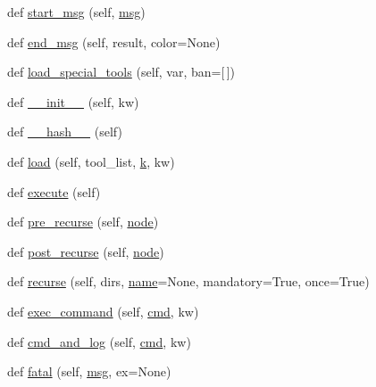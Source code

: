\begin{DoxyCompactItemize}
\item 
def \hyperlink{classwaflib_1_1_context_1_1_context_a344a0dff2c7b0d2d76057d55b83c3f16}{start\+\_\+msg} (self, \hyperlink{classwaflib_1_1_context_1_1_context_a7495a2e04e528aa54bda3cadf08240cb}{msg})
\item 
def \hyperlink{classwaflib_1_1_context_1_1_context_a6340799a7fa4dc1230d13b7c08eec789}{end\+\_\+msg} (self, result, color=None)
\item 
def \hyperlink{classwaflib_1_1_context_1_1_context_a95a53e6c363450df77f847bec6c56696}{load\+\_\+special\+\_\+tools} (self, var, ban=\mbox{[}$\,$\mbox{]})
\item 
def \hyperlink{classwaflib_1_1_context_1_1_context_ab8fabf802b21a8a8e77c3e3811c58c84}{\+\_\+\+\_\+init\+\_\+\+\_\+} (self, kw)
\item 
def \hyperlink{classwaflib_1_1_context_1_1_context_ae8096e428213ed965d8cd5629c2481a1}{\+\_\+\+\_\+hash\+\_\+\+\_\+} (self)
\item 
def \hyperlink{classwaflib_1_1_context_1_1_context_ad214db6a7b3ce05051972f7d073a74f2}{load} (self, tool\+\_\+list, \hyperlink{rfft2d_test_m_l_8m_adc468c70fb574ebd07287b38d0d0676d}{k}, kw)
\item 
def \hyperlink{classwaflib_1_1_context_1_1_context_ae98aa77cb954743799c5b730c6775329}{execute} (self)
\item 
def \hyperlink{classwaflib_1_1_context_1_1_context_a290c81ad18ad9b3c0bcbde2d8fce519e}{pre\+\_\+recurse} (self, \hyperlink{structnode}{node})
\item 
def \hyperlink{classwaflib_1_1_context_1_1_context_ab818cd610ecc0c6fa981f0cde9f3dd13}{post\+\_\+recurse} (self, \hyperlink{structnode}{node})
\item 
def \hyperlink{classwaflib_1_1_context_1_1_context_a10e3b0d5e63bb03a0a7adbb32c3dceab}{recurse} (self, dirs, \hyperlink{lib_2expat_8h_a1b49b495b59f9e73205b69ad1a2965b0}{name}=None, mandatory=True, once=True)
\item 
def \hyperlink{classwaflib_1_1_context_1_1_context_aaa7d209a0d05f2f8e45fc11b83c72dba}{exec\+\_\+command} (self, \hyperlink{sndfile__play_8m_adfc5ba7e22f5e4a6221c12a70503bef3}{cmd}, kw)
\item 
def \hyperlink{classwaflib_1_1_context_1_1_context_aaa63c5a7ac60f1bf164febe6642d270f}{cmd\+\_\+and\+\_\+log} (self, \hyperlink{sndfile__play_8m_adfc5ba7e22f5e4a6221c12a70503bef3}{cmd}, kw)
\item 
def \hyperlink{classwaflib_1_1_context_1_1_context_a42739307965d7ef470985d7bb7408788}{fatal} (self, \hyperlink{classwaflib_1_1_context_1_1_context_a7495a2e04e528aa54bda3cadf08240cb}{msg}, ex=None)

\end{DoxyCompactItemize}

